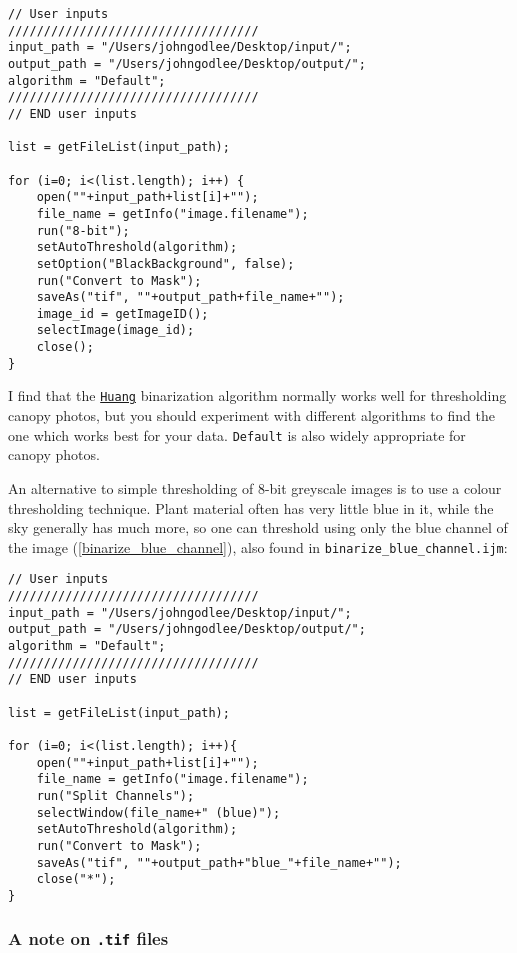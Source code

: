 \documentclass{article}
\begin{document}
\begin{lstlisting}[label=binarize,caption=ImageJ macro to binarize all images in a nominated directory.]
// User inputs
///////////////////////////////////
input_path = "/Users/johngodlee/Desktop/input/";
output_path = "/Users/johngodlee/Desktop/output/";
algorithm = "Default";
///////////////////////////////////
// END user inputs

list = getFileList(input_path);

for (i=0; i<(list.length); i++) {
	open(""+input_path+list[i]+"");
	file_name = getInfo("image.filename");
	run("8-bit");
	setAutoThreshold(algorithm);
	setOption("BlackBackground", false);
	run("Convert to Mask");
	saveAs("tif", ""+output_path+file_name+"");
	image_id = getImageID();
	selectImage(image_id);
	close();
}
\end{lstlisting}

I find that the \texttt{\href{http://www.ktl.elf.stuba.sk/study/vacso/Zadania-Cvicenia/Cvicenie\_3/TimA2/Huang\_E016529624.pdf}{Huang}} binarization algorithm normally works well for thresholding canopy photos, but you should experiment with different algorithms to find the one which works best for your data. \texttt{Default} is also widely appropriate for canopy photos.

An alternative to simple thresholding of 8-bit greyscale images is to use a colour thresholding technique. Plant material often has very little blue in it, while the sky generally has much more, so one can threshold using only the blue channel of the image (\autoref{binarize_blue_channel}), also found in \texttt{binarize\_blue\_channel.ijm}:

\begin{lstlisting}[label=binarize_blue_channel, caption=ImageJ macro to binarize images by the blue colour channel]
// User inputs
///////////////////////////////////
input_path = "/Users/johngodlee/Desktop/input/";
output_path = "/Users/johngodlee/Desktop/output/";
algorithm = "Default";
///////////////////////////////////
// END user inputs

list = getFileList(input_path);

for (i=0; i<(list.length); i++){
	open(""+input_path+list[i]+"");
	file_name = getInfo("image.filename");
	run("Split Channels");
	selectWindow(file_name+" (blue)");
	setAutoThreshold(algorithm);
	run("Convert to Mask");
	saveAs("tif", ""+output_path+"blue_"+file_name+"");
	close("*");
}
\end{lstlisting}

\subsubsection{A note on \texttt{.tif} files}
\end{document}
